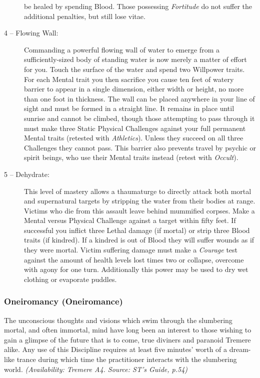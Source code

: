 \begin{description}
	be healed by spending Blood.  Those possessing \emph{Fortitude} do not suffer the additional penalties, but still 
	lose vitae.
	\item[4 -- Flowing Wall:]  Commanding a powerful flowing wall of water to emerge from a sufficiently-sized body of 
	standing water is now merely a matter of effort for you.  Touch the surface of the water and spend two Willpower 
	traits.  For each Mental trait you then sacrifice you cause ten feet of watery barrier to appear in a single dimension, 
	either width or height, no more than one foot in thickness.  The wall can be placed anywhere in your line of sight and must 
	be formed in a straight line.  It remains in place until sunrise and cannot be climbed, though those attempting to pass 
	through it must make three Static Physical Challenges against your full permanent Mental traits (retested with 
	\emph{Athletics}).  Unless they succeed on all three Challenges they cannot pass.  This barrier also prevents travel by 
	psychic or spirit beings, who use their Mental traits instead (retest with \emph{Occult}).
	\item[5 -- Dehydrate:]  This level of mastery allows a thaumaturge to directly attack both mortal and supernatural 
	targets by stripping the water from their bodies at range.  Victims who die from this assault leave behind mummified 
	corpses.  Make a Mental versus Physical Challenge against a target within fifty feet.  If successful you inflict three 
	Lethal damage (if mortal) or strip three Blood traits (if kindred).  If a kindred is out of Blood they will suffer wounds 
	as if they were mortal.  Victim suffering damage must make a \emph{Courage} test against the amount of health levels 
	lost times two or collapse, overcome with agony for one turn.  Additionally this power may be used to dry wet clothing 
	or evaporate puddles.  
\end{description}


\subsubsection{Oneiromancy (Oneiromance)}
The unconscious thoughts and visions which swim through the slumbering mortal, and often immortal, mind have long 
been an interest to those wishing to gain a glimpse of the future that is to come, true diviners and paranoid 
Tremere alike.  Any use of this Discipline requires at least five minutes' worth of a dream-like trance during 
which time the practitioner interacts with the slumbering world.  \emph{(Availability:  Tremere A4.  Source:  ST's 
Guide, p.54)}

